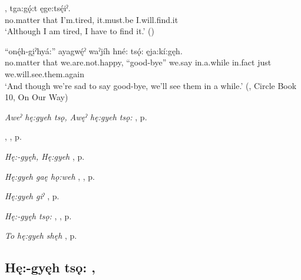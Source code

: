 \ea
\label{ex:hpar35}
, tga:gǫ́:t ęge:tsę́iˀ.\\
no.matter that I’m.tired, it.must.be I.will.find.it\\
\glt ‘Although I am tired, I have to find it.’ (\cite{carrier_legends_2013})
\z


\ea
\label{ex:hpar36}
 “onę́h-gi̱ˀhyá:” ayagwę́ˀ waˀjíh hné: tsǫ́: ęja:kí:gęh.\\
no.matter that we.are.not.happy, “good-bye” we.say in.a.while in.fact just we.will.see.them.again\\
\glt ‘And though we’re sad to say good-bye, we’ll see them in a while.’ (\cite{keye_circle_2016}, Circle Book 10, On Our Way)
\z


\begin{CayugaRelated}
\item \textit{Aweˀ hę:gyeh tsǫ, Awęˀ hę:gyeh tsǫ:} , p. \pageref{p:[aweˀ hę:gyeh tsǫ:]}\\
\item {} , , p. \pageref{p:[-gyęh]}\\
\item \textit{Hę:-gyęh, Hę:gyeh} , p. \pageref{p:[hę:-gyęh]}\\
\item \textit{Hę:gyeh gaę hǫ:weh} , , p. \pageref{p:[hę:-gyeh gaę hǫ:weh]}\\
\item \textit{Hę:gyeh giˀ} , p. \pageref{p:[hę:-gyeh giˀ]}\\
\item \textit{Hę:-gyęh tsǫ:} , , p. \pageref{p:[hę:-gyęh tsǫ:]}\\
\item \textit{To hę:gyeh shęh} , p. \pageref{p:[to hę:gyeh shęh]}
\end{CayugaRelated}

\subsection*{\textbf{Hę:-gyęh tsǫ:} , } \label{p:[hę:-gyęh tsǫ:]}

